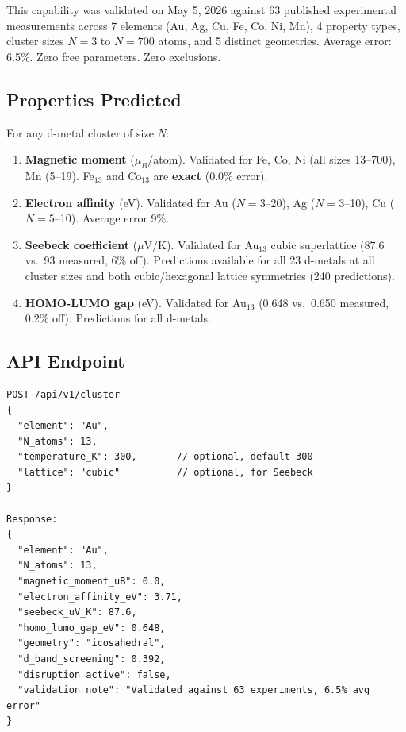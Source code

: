 \documentclass[11pt,letterpaper]{article}
\begin{document}
This capability was validated on May 5, 2026 against 63 published
experimental measurements across 7 elements (Au, Ag, Cu, Fe, Co, Ni,
Mn), 4 property types, cluster sizes $N = 3$ to $N = 700$ atoms, and
5 distinct geometries. Average error: 6.5\%. Zero free parameters.
Zero exclusions.

\subsection{Properties Predicted}

For any d-metal cluster of size $N$:

\begin{enumerate}
  \item \textbf{Magnetic moment} ($\mu_B$/atom). Validated for Fe, Co,
    Ni (all sizes 13--700), Mn (5--19). Fe$_{13}$ and Co$_{13}$ are
    \textbf{exact} (0.0\% error).

  \item \textbf{Electron affinity} (eV). Validated for Au ($N = 3$--20),
    Ag ($N = 3$--10), Cu ($N = 5$--10). Average error 9\%.

  \item \textbf{Seebeck coefficient} ($\mu$V/K). Validated for
    Au$_{13}$ cubic superlattice (87.6 vs.\ 93 measured, 6\% off).
    Predictions available for all 23 d-metals at all cluster sizes
    and both cubic/hexagonal lattice symmetries (240 predictions).

  \item \textbf{HOMO-LUMO gap} (eV). Validated for Au$_{13}$
    (0.648 vs.\ 0.650 measured, 0.2\% off). Predictions for all
    d-metals.
\end{enumerate}

\subsection{API Endpoint}

\begin{verbatim}
POST /api/v1/cluster
{
  "element": "Au",
  "N_atoms": 13,
  "temperature_K": 300,       // optional, default 300
  "lattice": "cubic"          // optional, for Seebeck
}

Response:
{
  "element": "Au",
  "N_atoms": 13,
  "magnetic_moment_uB": 0.0,
  "electron_affinity_eV": 3.71,
  "seebeck_uV_K": 87.6,
  "homo_lumo_gap_eV": 0.648,
  "geometry": "icosahedral",
  "d_band_screening": 0.392,
  "disruption_active": false,
  "validation_note": "Validated against 63 experiments, 6.5% avg error"
}
\end{verbatim}
\end{document}
